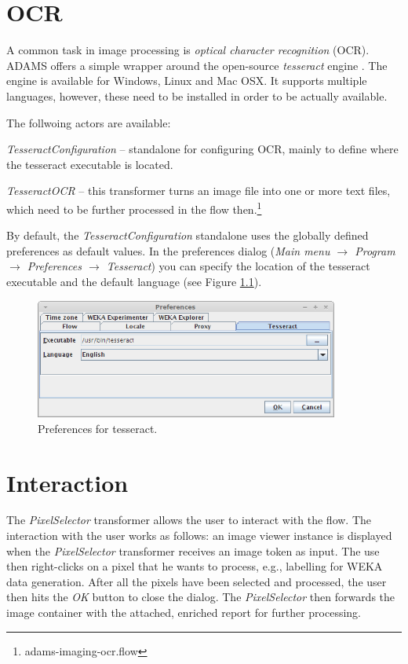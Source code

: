 \documentclass[a4paper]{book}
\begin{document}
\chapter{OCR}
A common task in image processing is \textit{optical character recognition} 
(OCR). ADAMS offers a simple wrapper around the open-source \textit{tesseract} 
engine \cite{tesseract}. The engine is available for Windows, Linux and Mac OSX.
It supports multiple languages, however, these need to be installed in order to
be actually available.

The follwoing actors are available:
\begin{tight_itemize}
	\item \textit{TesseractConfiguration} -- standalone for configuring OCR, 
	mainly to define where the tesseract executable is located.
	\item \textit{TesseractOCR} -- this transformer turns an image file into
	one or more text files, which need to be further processed in the flow
	then.\footnote{adams-imaging-ocr.flow}
\end{tight_itemize}

By default, the \textit{TesseractConfiguration} standalone uses the globally
defined preferences as default values. In the preferences dialog 
(\textit{Main menu $\rightarrow$ Program $\rightarrow$ Preferences 
$\rightarrow$ Tesseract}) you can specify the location of the tesseract
executable and the default language (see Figure \ref{tesseract-preferences}).
\begin{figure}[htb]
  \centering
  \includegraphics[width=10.0cm]{images/tesseract-preferences.png}
  \caption{Preferences for tesseract.}
  \label{tesseract-preferences}
\end{figure}


\chapter{Interaction}
The \textit{PixelSelector} transformer allows the user to interact with the
flow. The interaction with the user works as follows: an image viewer instance
is displayed when the \textit{PixelSelector} transformer receives an image token
as input. The use then right-clicks on a pixel that he wants to process, e.g.,
labelling for WEKA data generation. After all the pixels have been selected and
processed, the user then hits the \textit{OK} button to close the dialog. The
\textit{PixelSelector} then forwards the image container with the
attached, enriched report for further processing.
\end{document}
